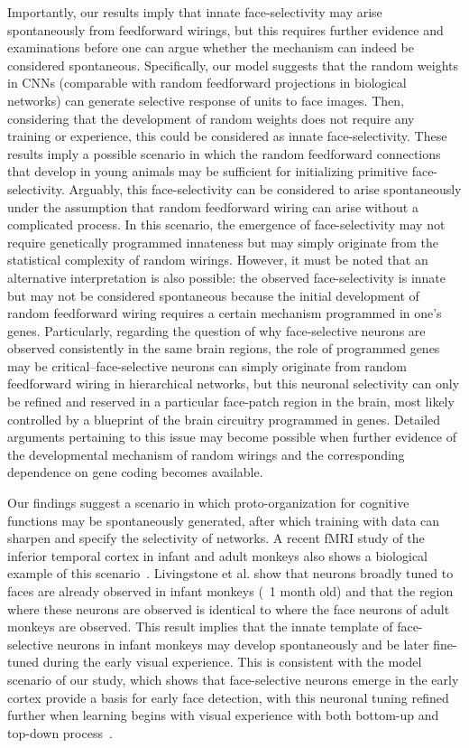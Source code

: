 \documentclass[final,3p,times,twocolumn]{elsarticle}
\begin{document}
Importantly, our results imply that innate face-selectivity may arise spontaneously from feedforward wirings, 
but this requires further evidence and examinations before one can argue whether the mechanism can indeed be considered spontaneous.
Specifically, our model suggests that the random weights in CNNs (comparable with random feedforward projections in biological networks) can generate selective response of units to face images.
Then, considering that the development of random weights does not require any training or experience, this could be considered as innate face-selectivity.
These results imply a possible scenario in which the random feedforward connections that develop in young animals may be sufficient for initializing primitive face-selectivity.
Arguably, this face-selectivity can be considered to arise spontaneously under the assumption that random feedforward wiring can arise without a complicated process.
In this scenario, the emergence of face-selectivity may not require genetically programmed innateness but may simply originate from the statistical complexity of random wirings.
However, it must be noted that an alternative interpretation is also possible:
the observed face-selectivity is innate but may not be considered spontaneous because the initial development of random feedforward wiring requires a certain mechanism programmed in one's genes.
Particularly, regarding the question of why face-selective neurons are observed consistently in the same brain regions, the role of programmed genes may be critical--face-selective neurons can simply originate from random feedforward wiring in hierarchical networks,
but this neuronal selectivity can only be refined and reserved in a particular face-patch region in the brain, 
most likely controlled by a blueprint of the brain circuitry programmed in genes.
Detailed arguments pertaining to this issue may become possible when further evidence of the developmental mechanism of random wirings and the corresponding dependence on gene coding becomes available.


Our findings suggest a scenario in which proto-organization for cognitive functions may be spontaneously generated, 
after which training with data can sharpen and specify the selectivity of networks.
A recent fMRI study of the inferior temporal cortex in infant and adult monkeys also shows a biological example of this scenario~\cite{livingstone2017development}.
Livingstone et al. show that neurons broadly tuned to faces are already observed in infant monkeys (~1 month old) 
and that the region where these neurons are observed is identical to where the face neurons of adult monkeys are observed.
This result implies that the innate template of face-selective neurons in infant monkeys may develop spontaneously and be later fine-tuned during the early visual experience.
This is consistent with the model scenario of our study, which shows that face-selective neurons emerge in the early cortex provide a basis for early face detection,
with this neuronal tuning refined further when learning begins with visual experience with both bottom-up and top-down process~\cite{yan2018bottom,epshtein2008image}.
\end{document}
